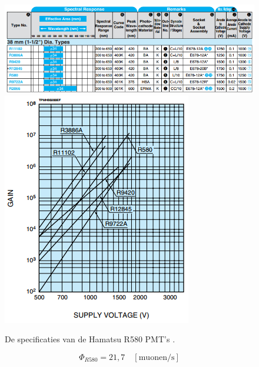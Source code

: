\begin{figure}[!htbp]
\begin{center}
\includegraphics[width=\textwidth]{figuren/PMTspecs}
\includegraphics[width=\textwidth]{figuren/PMTgain}
\end{center}
\caption{De specificaties van de Hamatsu R580 PMT's \cite{pmtmanual}.}\label{fig:pmtspecs}
\end{figure}

\begin{equation}
	\Phi_{R580} = 21,7 \quad \mathrm{[muonen/s]}
\end{equation}

